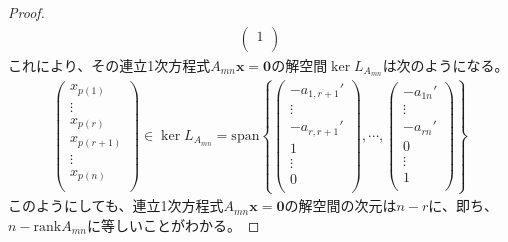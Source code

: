 \documentclass[dvipdfmx]{jsarticle}
\begin{document}
\begin{proof}
\begin{align*}
\begin{pmatrix}
1 \\
\end{pmatrix}
\end{align*}
これにより、その連立1次方程式$A_{mn}\mathbf{x} = \mathbf{0}$の解空間$\ker L_{A_{mn}}$は次のようになる。
\begin{align*}
\begin{pmatrix}
x_{p(1)} \\
 \vdots \\
x_{p(r)} \\
x_{p(r + 1)} \\
 \vdots \\
x_{p(n)} \\
\end{pmatrix} \in \ker L_{A_{mn}} = {\mathrm{span} }\left\{ \begin{pmatrix}
 - a_{1,r + 1}' \\
 \vdots \\
 - a_{r,r + 1}' \\
1 \\
 \vdots \\
0 \\
\end{pmatrix},\cdots,\begin{pmatrix}
 - a_{1n}' \\
 \vdots \\
 - a_{rn}' \\
0 \\
 \vdots \\
1 \\
\end{pmatrix} \right\}
\end{align*}
このようにしても、連立1次方程式$A_{mn}\mathbf{x} = \mathbf{0}$の解空間の次元は$n - r$に、即ち、$n - {\mathrm{rank}}A_{mn}$に等しいことがわかる。
\end{proof}
\end{document}
